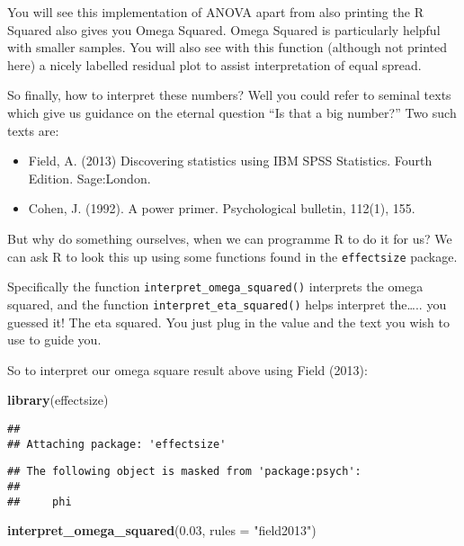 \documentclass[
]{book}
\newenvironment{Shaded}{\begin{snugshade}}{\end{snugshade}}
\newcommand{\AttributeTok}[1]{\textcolor[rgb]{0.13,0.29,0.53}{#1}}
\newcommand{\FloatTok}[1]{\textcolor[rgb]{0.00,0.00,0.81}{#1}}
\newcommand{\FunctionTok}[1]{\textcolor[rgb]{0.13,0.29,0.53}{\textbf{#1}}}
\newcommand{\NormalTok}[1]{#1}
\newcommand{\StringTok}[1]{\textcolor[rgb]{0.31,0.60,0.02}{#1}}
\providecommand{\tightlist}{%
  \setlength{\itemsep}{0pt}\setlength{\parskip}{0pt}}
\begin{document}
You will see this implementation of ANOVA apart from also printing the R Squared also gives you Omega Squared. Omega Squared is particularly helpful with smaller samples. You will also see with this function (although not printed here) a nicely labelled residual plot to assist interpretation of equal spread.

So finally, how to interpret these numbers? Well you could refer to seminal texts which give us guidance on the eternal question ``Is that a big number?'' Two such texts are:

\begin{itemize}
\tightlist
\item
  Field, A. (2013) Discovering statistics using IBM SPSS Statistics. Fourth Edition. Sage:London.
\item
  Cohen, J. (1992). A power primer. Psychological bulletin, 112(1), 155.
\end{itemize}

But why do something ourselves, when we can programme R to do it for us? We can ask R to look this up using some functions found in the \texttt{effectsize} package.

Specifically the function \texttt{interpret\_omega\_squared()} interprets the omega squared, and the function \texttt{interpret\_eta\_squared()} helps interpret the\ldots.. you guessed it! The eta squared. You just plug in the value and the text you wish to use to guide you.

So to interpret our omega square result above using Field (2013):

\begin{Shaded}
\begin{Highlighting}[]
\FunctionTok{library}\NormalTok{(effectsize)}
\end{Highlighting}
\end{Shaded}

\begin{verbatim}
## 
## Attaching package: 'effectsize'
\end{verbatim}

\begin{verbatim}
## The following object is masked from 'package:psych':
## 
##     phi
\end{verbatim}

\begin{Shaded}
\begin{Highlighting}[]
\FunctionTok{interpret\_omega\_squared}\NormalTok{(}\FloatTok{0.03}\NormalTok{, }\AttributeTok{rules =} \StringTok{"field2013"}\NormalTok{)}
\end{Highlighting}
\end{Shaded}
\end{document}

